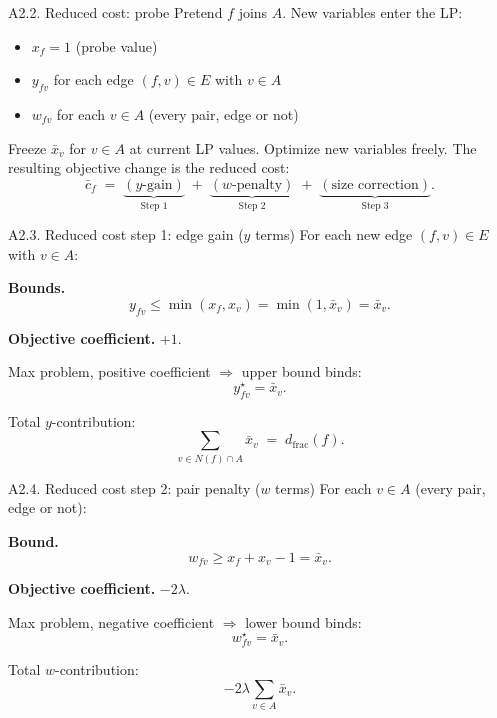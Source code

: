 \documentclass{beamer}
\begin{document}
\begin{frame}{A2.2. Reduced cost: probe}
  Pretend $f$ joins $A$. New variables enter the LP:
  \begin{itemize}
    \item $x_f = 1$ (probe value)
    \item $y_{fv}$ for each edge $(f, v) \in E$ with $v \in A$
    \item $w_{fv}$ for each $v \in A$ (every pair, edge or not)
  \end{itemize}

  \vfill

  Freeze $\bar{x}_v$ for $v \in A$ at current LP values. Optimize new variables freely. The resulting objective change is the reduced cost:
  \[
    \bar{c}_f \;=\; \underbrace{(y\text{-gain})}_{\text{Step 1}} \;+\; \underbrace{(w\text{-penalty})}_{\text{Step 2}} \;+\; \underbrace{(\text{size correction})}_{\text{Step 3}}.
  \]
\end{frame}

\begin{frame}{A2.3. Reduced cost step 1: edge gain ($y$ terms)}
  For each new edge $(f, v) \in E$ with $v \in A$:

  \vfill

  \textbf{Bounds.}
  \[
    y_{fv} \le \min(x_f, x_v) = \min(1, \bar{x}_v) = \bar{x}_v.
  \]

  \textbf{Objective coefficient.} $+1$.

  \vfill

  Max problem, positive coefficient $\Rightarrow$ upper bound binds:
  \[
    y_{fv}^\star = \bar{x}_v.
  \]

  \vfill

  Total $y$-contribution:
  \[
    \sum_{v \in N(f) \cap A} \bar{x}_v \;=\; d_{\mathrm{frac}}(f).
  \]
\end{frame}

\begin{frame}{A2.4. Reduced cost step 2: pair penalty ($w$ terms)}
  For each $v \in A$ (every pair, edge or not):

  \vfill

  \textbf{Bound.}
  \[
    w_{fv} \ge x_f + x_v - 1 = \bar{x}_v.
  \]

  \textbf{Objective coefficient.} $-2\lambda$.

  \vfill

  Max problem, negative coefficient $\Rightarrow$ lower bound binds:
  \[
    w_{fv}^\star = \bar{x}_v.
  \]

  \vfill

  Total $w$-contribution:
  \[
    -2\lambda \sum_{v \in A} \bar{x}_v.
  \]
\end{frame}
\end{document}
